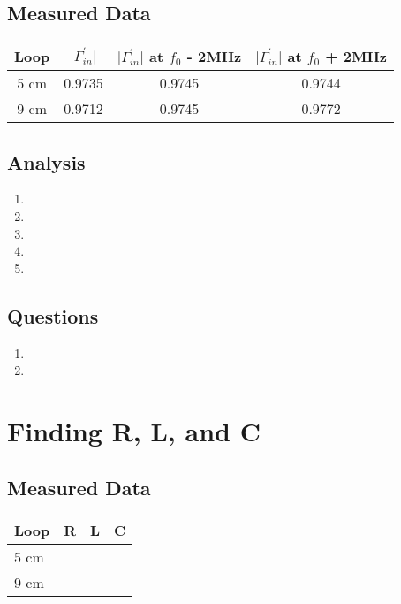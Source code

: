 \documentclass{article}
\begin{document}
\subsection{Measured Data}
\begin{table}[H]
\centering
\begin{tabular}{|c|c|c|c|}
\hline
Loop & $\vert\Gamma^{\prime}_{in}\vert$ & $\vert\Gamma^{\prime}_{in}\vert$ at $f_0$ - 2MHz & $\vert\Gamma^{\prime}_{in}\vert$ at $f_0$ + 2MHz \\ \hline
5 cm & 0.9735 & 0.9745 & 0.9744 \\ \hline
9 cm & 0.9712 & 0.9745 & 0.9772 \\ \hline
\end{tabular}
\end{table}

\subsection{Analysis}
\begin{enumerate}
	\item 
	\item 
	\item 
	\item 
	\item 
\end{enumerate}

\subsection{Questions}
\begin{enumerate}
	\item 
	\item 
\end{enumerate}


\section{Finding R, L, and C}

\subsection{Measured Data}
\begin{table}[H]
\centering
\begin{tabular}{|l|l|l|l|}
\hline
Loop & R & L & C \\ \hline
5 cm &   &   &  \\ \hline
9 cm &   &   &  \\ \hline
\end{tabular}
\end{table}
\end{document}

